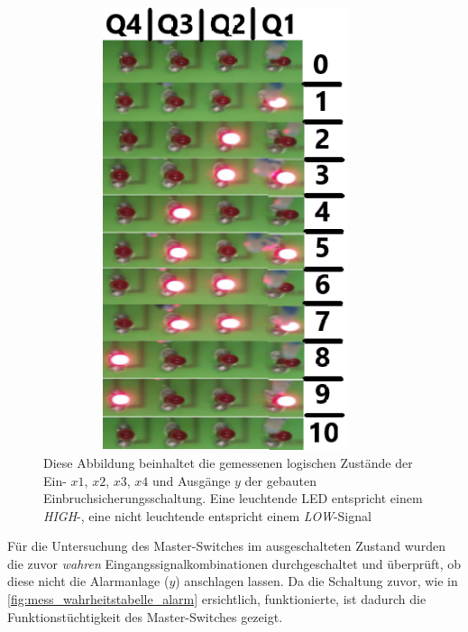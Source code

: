 \documentclass[12pt,english,ngerman]{scrartcl}
\begin{document}
\begin{figure}[H]
  \centering
    \includegraphics[width=0.95\textwidth,height=13cm]{./figures/messungen/4bit/wahrheit.png}
  \caption{Diese Abbildung beinhaltet die gemessenen logischen Zustände der
    Ein- $x1$, $x2$, $x3$, $x4$ und Ausgänge $y$ der gebauten
    Einbruchsicherungsschaltung. Eine leuchtende LED entspricht einem
    \textit{HIGH}-, eine nicht leuchtende entspricht einem \textit{LOW}-Signal}
  \label{fig:mess_wahrheitstabelle_alarm}
\end{figure}

Für die Untersuchung des Master-Switches im ausgeschalteten Zustand wurden die
zuvor \textit{wahren} Eingangssignalkombinationen durchgeschaltet und überprüft, ob diese
nicht die Alarmanlage ($y$) anschlagen lassen. Da die Schaltung zuvor, wie in
\autoref{fig:mess_wahrheitstabelle_alarm} ersichtlich, funktionierte, ist
dadurch die Funktionstüchtigkeit des Master-Switches gezeigt.


\end{document}
